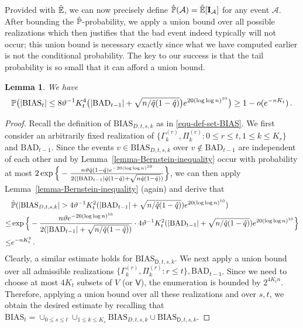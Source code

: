 \documentclass[11pt]{article}
\newtheorem{Lemma}[Theorem]{Lemma}
\numberwithin{equation}{section}
\begin{document}
Provided with $\Hat{\mathbb E}$, we can now precisely define $\Hat{\mathbb P}(\mathcal A) = \Hat{\mathbb E}[\mathbf I_{\mathcal A}]$ for any event $\mathcal A$. 
After bounding the $\Hat{\mathbb P}$-probability, we apply a union bound over all possible realizations which then justifies that the bad event indeed typically will not occur; this union bound is necessary exactly since what we have computed earlier is not the conditional probability. The key to our success is that the tail probability is so small that it can afford a union bound.


\begin{Lemma} \label{lemma-bound-cardinality-BIAS}
We have 
\begin{align*}
    \mathbb P \big( |\mathrm{BIAS}_{t}| \leq 8 \vartheta^{-1} K^4_t \big( |\mathrm{BAD}_{t-1}| + \sqrt{n / \Hat{q}(1-\Hat{q})} \big) e^{ 20 (\log \log n)^{10} } \big) \geq  1-o(e^{-n K_t})\,.
\end{align*}
\end{Lemma}
\begin{proof}
Recall the definition of $\mathrm{BIAS}_{D,t,s,k}$ as in \eqref{equ-def-set-BIAS}. 
We first consider an arbitrarily fixed realization of $\{ \Gamma^{(r)}_k, \Pi^{(r)}_k : 0 \leq r \leq t, 1\leq k\leq K_r \}$ and $\mathrm{BAD}_{t-1}$. Since the events $v \in \mathrm{BIAS}_{D,t,s,k}$ over $v\not\in \mathrm{BAD}_{t-1}$ are independent of each other and by Lemma~\ref{lemma-Bernstein-inequality} occur with probability at most $2 \exp \Big\{ - \frac{ n \vartheta \Hat{q} (1-\Hat{q}) e^{ - 20 (\log \log n)^{10} } }{ 2( |\mathrm{BAD}_{t-1}| \Hat{q}(1-\Hat{q}) + \sqrt{n \Hat{q}(1-\Hat{q})} ) } \Big\}$, we can then  apply Lemma~\ref{lemma-Bernstein-inequality} (again) and derive that 
\begin{align*}
    &\Hat{\mathbb P}(|\mathrm{BIAS}_{D,t,s,k}| > 4\vartheta^{-1} K_t^2 ( |\mathrm{BAD}_{t-1}| + \sqrt{n/\Hat{q}(1-\Hat{q})}) e^{ 20 (\log \log n)^{10} })\\
    \leq&\exp \Big\{ - \frac{ n \vartheta e^{ -20 (\log \log n)^{10} }  }{ 2 ( |\mathrm{BAD}_{t-1}| + \sqrt{n / \Hat{q}(1-\Hat{q})}) } \cdot 4 \vartheta^{-1} K_t^2 ( |\mathrm{BAD}_{t-1}| + \sqrt{n/\Hat{q}(1-\Hat{q})}) e^{ 20 (\log \log n)^{10} } \Big\}\\
     \leq & e^{- n K^2_t} \,.
\end{align*}
Clearly, a similar estimate holds for $\mathrm{BIAS}_{\mathsf D,t,s,k}$.
We next apply a union bound over all admissible realizations $\{ \Gamma^{(r)}_k, \Pi^{(r)}_k : r \leq t \}, \mathrm{BAD}_{t-1}$. Since we need to choose at most $4K_t$ subsets of $V$ (or $\mathsf{V}$), the enumeration is bounded by $2^{4K_t n}$. Therefore, applying a union bound over all these realizations and over $s, t$, we obtain the desired estimate by recalling that $\mathrm{BIAS}_t = \cup_{0 \leq s \leq t} \cup_{1 \leq k \leq K_s} \mathrm{BIAS}_{D,t,s,k} \cup \mathrm{BIAS}_{\mathsf{D},t,s,k}$.
\end{proof} 
\end{document}
